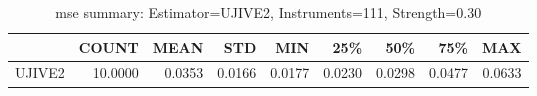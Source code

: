 \begin{table}[ht]
\centering
\caption{mse summary: Estimator=UJIVE2, Instruments=111, Strength=0.30}
\begin{tabular}{lrrrrrrrr}
\toprule
 & COUNT & MEAN & STD & MIN & 25\% & 50\% & 75\% & MAX \\
\midrule
UJIVE2 & 10.0000 & 0.0353 & 0.0166 & 0.0177 & 0.0230 & 0.0298 & 0.0477 & 0.0633 \\
\bottomrule
\end{tabular}
\end{table}
